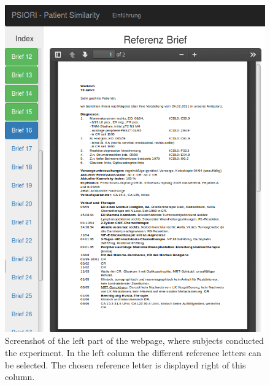 \begin{figure}[h]
	\centering
	\includegraphics[width=0.9\linewidth]{figures/webexperiment_screenshot_left}
	\caption{Screenshot of the left part of the webpage, where subjects conducted the experiment. In the left column the different reference letters can be selected. The chosen reference letter is displayed right of this column.}
	\label{fig:webexperiment_left}
\end{figure}

